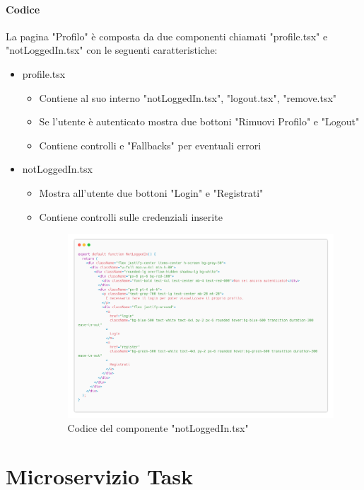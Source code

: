 \documentclass{report}
\begin{document}
\subsubsection*{Codice}
La pagina "Profilo" è composta da due componenti chiamati "profile.tsx" e "notLoggedIn.tsx" con le seguenti caratteristiche:
\begin{itemize}
	\item profile.tsx
	\begin{itemize}
		\item Contiene al suo interno "notLoggedIn.tsx", "logout.tsx", "remove.tsx"
		\item Se l'utente è autenticato mostra due bottoni "Rimuovi Profilo" e "Logout"
		\item Contiene controlli e "Fallbacks" per eventuali errori
	\end{itemize}
	\item notLoggedIn.tsx
	\begin{itemize}
		\item Mostra all'utente due bottoni "Login" e "Registrati"
		\item Contiene controlli sulle credenziali inserite
		\begin{figure}[H]
			\centering\includegraphics[width=1\textwidth]{images/microservizio-autenticazione/frontend/notLoggedIn-carbon.png}
			Codice del componente "notLoggedIn.tsx"
		\end{figure}
	\end{itemize}
\end{itemize}




\chapter{Microservizio Task}
\end{document}
